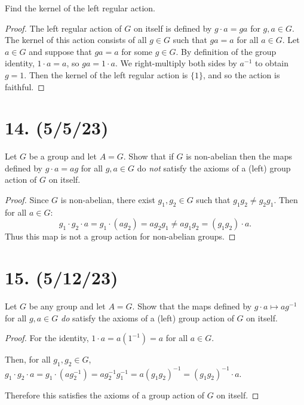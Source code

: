 \documentclass{article}
\begin{document}
Find the kernel of the left regular action.

\begin{proof}
  The left regular action of $G$ on itself is defined by $g \cdot a = ga$ for $g, a \in G$. The kernel of this action consists of all $g \in G$ such that $ga = a$ for all $a \in G$. Let $a \in G$ and suppose that $ga = a$ for some $g \in G$. By definition of the group identity, $1 \cdot a = a$, so $ga = 1 \cdot a$. We right-multiply both sides by $a^{-1}$ to obtain $g = 1$. Then the kernel of the left regular action is $\{ 1 \}$, and so the action is faithful.
\end{proof}

\section*{14. (5/5/23)}

Let $G$ be a group and let $A = G$. Show that if $G$ is non-abelian then the maps defined by $g \cdot a = ag$ for all $g, a \in G$ do \emph{not} satisfy the axioms of a (left) group action of $G$ on itself.

\begin{proof}
  Since $G$ is non-abelian, there exist $g_1, g_2 \in G$ such that $g_1 g_2 \neq g_2 g_1$. Then for all $a \in G$:
  \begin{equation*}
    g_1 \cdot g_2 \cdot a = g_1 \cdot (a g_2) = a g_2 g_1 \neq a g_1 g_2 = (g_1 g_2) \cdot a.
  \end{equation*}
  Thus this map is not a group action for non-abelian groups.
\end{proof}

\section*{15. (5/12/23)}

Let $G$ be any group and let $A = G$. Show that the maps defined by $g \cdot a \mapsto ag^{-1}$ for all $g, a \in G$ \emph{do} satisfy the axioms of a (left) group action of $G$ on itself.

\begin{proof}
  For the identity, $1 \cdot a = a (1^{-1}) = a$ for all $a \in G$.
  
  Then, for all $g_1, g_2 \in G$, $g_1 \cdot g_2 \cdot a = g_1 \cdot (a g_2^{-1}) = a g_2^{-1} g_1^{-1} = a (g_1 g_2)^{-1} = (g_1 g_2)^{-1} \cdot a$.

  Therefore this satisfies the axioms of a group action of $G$ on itself.
\end{proof}
\end{document}
